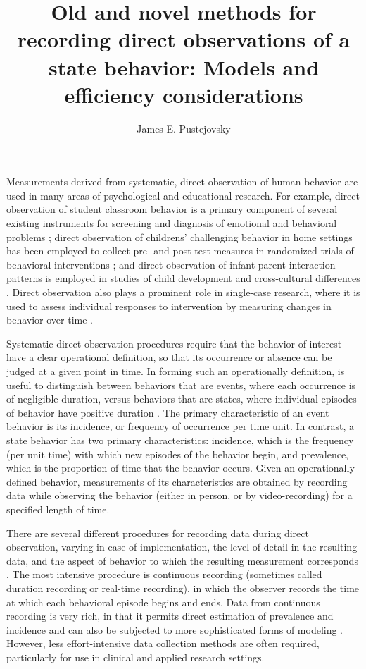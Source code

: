\documentclass[man, noextraspace, floatsintext]{apa6}\usepackage[]{graphicx}\usepackage[]{color}
\title{Old and novel methods for recording direct observations of a state behavior: Models and efficiency considerations}
\author{James E. Pustejovsky}
\affiliation{The University of Texas at Austin}
\begin{document}
\maketitle

Measurements derived from systematic, direct observation of human behavior are used in many areas of psychological and educational research. 
For example, direct observation of student classroom behavior is a primary component of several existing instruments for screening and diagnosis of emotional and behavioral problems \citep{Volpe2005observing}; direct observation of childrens' challenging behavior in home settings has been employed to collect pre- and post-test measures in randomized trials of behavioral interventions \citep[e.g.,][]{Durand2012positive}; and direct observation of infant-parent interaction patterns is employed in studies of child development \citep{Mann1991time} and cross-cultural differences \citep{Bornstein2002measurement}. 
Direct observation also plays a prominent role in single-case research, where it is used to assess individual responses to intervention by measuring changes in behavior over time \citep{Kazdin2011single}.

Systematic direct observation procedures require that the behavior of interest have a clear operational definition, so that its occurrence or absence can be judged at a given point in time. 
In forming such an operationally definition, is useful to distinguish between behaviors that are events, where each occurrence is of negligible duration, versus behaviors that are states, where individual episodes of behavior have positive duration \citep{Altmann1974observational}. 
The primary characteristic of an event behavior is its incidence, or frequency of occurrence per time unit. 
In contrast, a state behavior has two primary characteristics: incidence, which is the frequency (per unit time) with which new episodes of the behavior begin, and prevalence, which is the proportion of time that the behavior occurs. 
Given an operationally defined behavior, measurements of its characteristics are obtained by recording data while observing the behavior (either in person, or by video-recording) for a specified length of time. 

There are several different procedures for recording data during direct observation, varying in ease of implementation, the level of detail in the resulting data, and the aspect of behavior to which the resulting measurement corresponds \citep[for surveys of major recording procedures, see][]{Altmann1974observational, Ayres2010dependent, Hartmann1990observational, Primavera1996measurement}. 
The most intensive procedure is continuous recording (sometimes called duration recording or real-time recording), in which the observer records the time at which each behavioral episode begins and ends.
Data from continuous recording is very rich, in that it permits direct estimation of prevalence and incidence and can also be subjected to more sophisticated forms of modeling \citep[e.g.,][]{Bakeman2011sequential, Haccou1992statistical}. 
However, less effort-intensive data collection methods are often required, particularly for use in clinical and applied research settings. 
\end{document}

